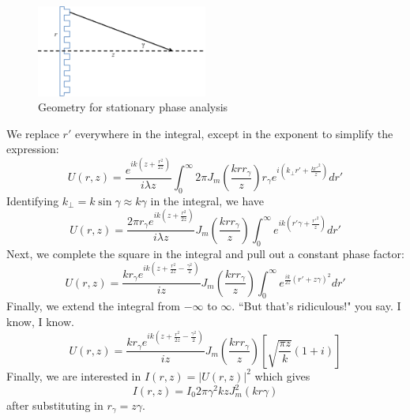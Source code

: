 \documentclass[12pt]{revtex4-1}
\begin{document}
\begin{figure}[tbh]
    \includegraphics[width=0.5\textwidth]{kinoform_geom.png}
    \caption{Geometry for stationary phase analysis}
\end{figure}

We replace $r'$ everywhere in the integral, except in the exponent to simplify the expression:
\begin{equation}
U(r,z) = \frac{e^{ik(z+\frac{r^2}{2z})}}{i\lambda z}\int_0^\infty 2\pi J_m\left(\frac{krr_\gamma}{z}\right) r_\gamma e^{i(k_{\perp}r' + \frac{kr'^2}{z})}dr'
\end{equation}
Identifying $k_\perp = k\sin\gamma \approx k\gamma$ in the integral, we have
\begin{equation}
U(r,z) = \frac{2\pi r_\gamma e^{ik(z+\frac{r^2}{2z})}}{i\lambda z} J_m\left(\frac{krr_\gamma}{z}\right) \int_0^\infty e^{ik(r'\gamma + \frac{r'^2}{z})}dr'
\end{equation}
Next, we complete the square in the integral and pull out a constant phase factor:
\begin{equation}
U(r,z) = \frac{k r_\gamma e^{ik(z+\frac{r^2}{2z}-\frac{\gamma^2}{2})}}{i z} J_m\left(\frac{krr_\gamma}{z}\right) \int_0^\infty e^{\frac{ik}{2z}(r'+z\gamma)^2}dr'
\end{equation}
Finally, we extend the integral from $-\infty$ to $\infty$. ``But that's ridiculous!" you say. I know, I know.
\begin{equation}
U(r,z) = \frac{k r_\gamma e^{ik(z+\frac{r^2}{2z}-\frac{\gamma^2}{2})}}{i z} J_m\left(\frac{krr_\gamma}{z}\right)\left[\sqrt{\frac{\pi z}{k}}(1+i)\right]
\end{equation}
Finally, we are interested in $I(r,z) = |U(r,z)|^2$ which gives
\begin{equation}
I(r,z) = I_0 2 \pi \gamma^2 kz J_m^2(kr\gamma)
\end{equation}
after substituting in $r_\gamma = z\gamma$.
\end{document}

